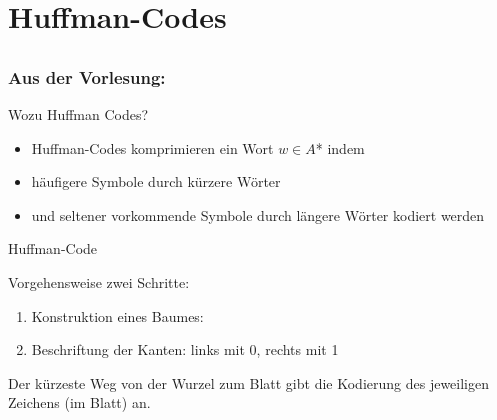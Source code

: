 
\section{Huffman-Codes}
\subsection*{}
\begin{frame}
	\frametitle{Aus der Vorlesung:}
	\begin{block}{Wozu Huffman Codes?}
    		\begin{itemize}
              \item Huffman-Codes komprimieren ein Wort $w \in A$* indem \pause
              \item häufigere Symbole durch kürzere Wörter \pause
              \item und seltener vorkommende Symbole durch längere Wörter kodiert werden
            \end{itemize}
    	\end{block}
\end{frame}

\begin{frame}{Huffman-Code}
	\begin{block}{Vorgehensweise}
		zwei Schritte:
    		\begin{enumerate}
			\item Konstruktion eines Baumes:
				\begin{itemize}
				\end{itemize}
			\item Beschriftung der Kanten: links mit 0, rechts mit 1
		\end{enumerate}
		Der kürzeste Weg von der Wurzel zum Blatt gibt die Kodierung des jeweiligen Zeichens (im Blatt) an.
    	\end{block}
\end{frame}

